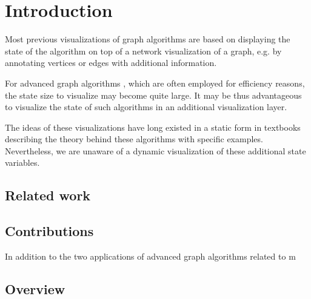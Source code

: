 \chapter{Introduction}\label{ch:1}

Most previous visualizations of graph algorithms \cite{storz2013idp,velden2014idp,sefidgar2015idp,becker2015idp,zoennchen2015idp,fischer2016idp,feil2016idp} are based on displaying the state of the algorithm on top of a network visualization of a graph, e.g. by annotating vertices or edges with additional information.

For advanced graph algorithms \cite{goldberg1988new,irnich2005shortest}, which are often employed for efficiency reasons, the state size to visualize may become quite large. It may be thus advantageous to visualize the state of such algorithms in an additional visualization layer. 

The ideas of these visualizations have long existed in a static form in textbooks describing the theory behind these algorithms with specific examples. Nevertheless, we are unaware of a dynamic visualization of these additional state variables.

\section{Related work}
\section{Contributions}
In addition to the two applications of advanced graph algorithms related to m

\section{Overview}
